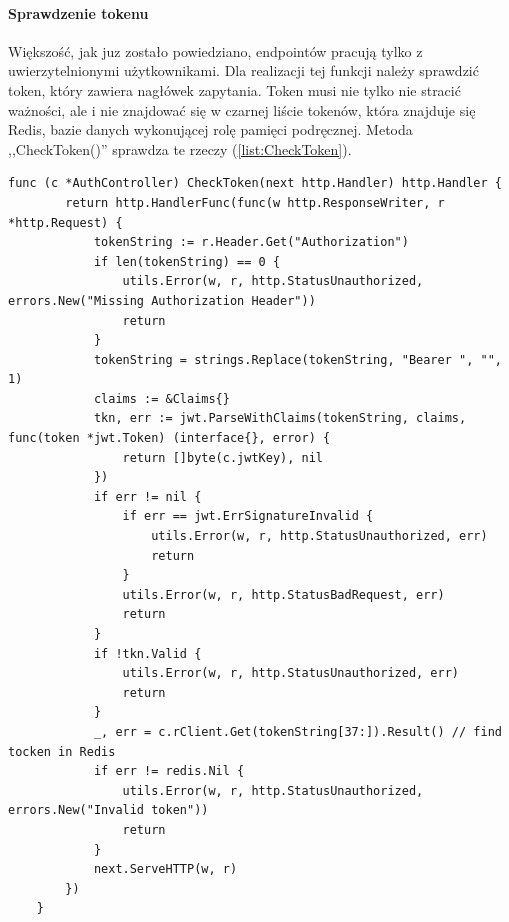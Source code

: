 \paragraph{Sprawdzenie tokenu}
\newline
Większość, jak juz zostało powiedziano, endpointów pracują tylko z uwierzytelnionymi użytkownikami. Dla realizacji tej funkcji należy sprawdzić token, który zawiera nagłówek zapytania.
Token musi nie tylko nie stracić ważności, ale i nie znajdować się w czarnej liście tokenów, która znajduje się Redis, bazie danych wykonującej rolę pamięci podręcznej.
Metoda ,,CheckToken()'' sprawdza te rzeczy (\ref{list:CheckToken}).
\begin{lstlisting}[label=list:CheckToken,caption=Walidacja JWT tokenu,basicstyle=\tiny\ttfamily]
    func (c *AuthController) CheckToken(next http.Handler) http.Handler {
        return http.HandlerFunc(func(w http.ResponseWriter, r *http.Request) {
            tokenString := r.Header.Get("Authorization")
            if len(tokenString) == 0 {
                utils.Error(w, r, http.StatusUnauthorized, errors.New("Missing Authorization Header"))
                return
            }
            tokenString = strings.Replace(tokenString, "Bearer ", "", 1)
            claims := &Claims{}
            tkn, err := jwt.ParseWithClaims(tokenString, claims, func(token *jwt.Token) (interface{}, error) {
                return []byte(c.jwtKey), nil
            })
            if err != nil {
                if err == jwt.ErrSignatureInvalid {
                    utils.Error(w, r, http.StatusUnauthorized, err)
                    return
                }
                utils.Error(w, r, http.StatusBadRequest, err)
                return
            }
            if !tkn.Valid {
                utils.Error(w, r, http.StatusUnauthorized, err)
                return
            }
            _, err = c.rClient.Get(tokenString[37:]).Result() // find tocken in Redis
            if err != redis.Nil {
                utils.Error(w, r, http.StatusUnauthorized, errors.New("Invalid token"))
                return
            }
            next.ServeHTTP(w, r)
        })
    }
\end{lstlisting}

